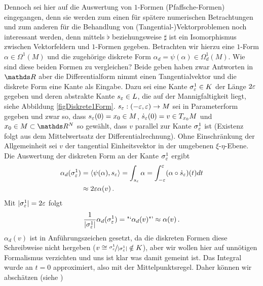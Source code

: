 \begin{bemerkung}
    Dennoch sei hier auf die Auswertung von \( 1 \)-Formen (Pfaffsche-Formen) eingegangen, 
    denn sie werden zum einen für spätere numerischen Betrachtungen und zum anderen für die Behandlung von (Tangential-)Vektorproblemen
    noch interessant werden, denn mittels \( \flat \) beziehungsweise \( \sharp \) ist ein Isomorphismus zwischen Vektorfeldern und \( 1 \)-Formen gegeben.
    Betrachten wir hierzu eine \( 1 \)-Form \( \alpha\in\Omega^{1}(M) \) und die zugehörige diskrete Form \( \alpha_{d} = \psi(\alpha)\in\Omega^{1}_{d}(M) \).
    Wie sind diese beiden Formen zu vergleichen? 
    Beide geben haben zwar Antworten in \( \R \) aber die Differentialform nimmt einen Tangentialvektor und die diskrete Form eine Kante als Eingabe. 
    Dazu sei eine Kante \( \sigma^{1}_{\varepsilon} \in K\) der Länge \( 2\varepsilon \) gegeben und deren abstrakte Kante \( s_{\varepsilon}\in L \), die auf der Mannigfaltigkeit liegt, 
    siehe Abbildung \ref{figDiskrete1Form}.
    \( s_{\varepsilon}: (-\varepsilon,\varepsilon)\rightarrow M \) sei in Parameterform gegeben und zwar so, dass \( s_{\varepsilon}(0)=x_{0}\in M \), \( \dot{s}_{\varepsilon}(0) = v \in T_{x_{0}}M \) 
    und \( x_{0}\in M \subset \R^{N} \) so gewählt, dass \( v \) parallel zur Kante \( \sigma^{1}_{\varepsilon} \) ist (Existenz folgt aus dem Mittelwertsatz der Differentialrechnung).
    Ohne Einschränkung der Allgemeinheit sei \( v \) der tangential Einheitsvektor in der umgebenen \( \xi \)-\( \eta \)-Ebene.
    Die Auswertung der diskreten Form an der Kante \( \sigma^{1}_{\varepsilon} \) ergibt
    \begin{align}
        \alpha_{d}(\sigma_{\varepsilon}^{1}) &= \langle \psi(\alpha) , s_{\varepsilon} \rangle = \int_{s_{\varepsilon}}\alpha = \int_{-\varepsilon}^{\varepsilon} (\alpha \circ \dot{s}_{\varepsilon})(t) dt\\
                                 &\approx 2\varepsilon \alpha(v) \,\text{.}
    \end{align}
    Mit \( |\sigma^{1}_{\varepsilon}| = 2\varepsilon \) folgt 
    \begin{align}
    \label{eqApprox1Form}
      \frac{1}{|\sigma^{1}_{\varepsilon}|} \alpha_{d}(\sigma_{\varepsilon}^{1}) = \text{"`}\alpha_{d}(v)\text{"'} \approx \alpha(v)\,\text{.}
    \end{align}
    \( \alpha_{d}(v) \) ist in Anführungszeichen gesetzt, da die diskreten Formen diese Schreibweise nicht hergeben (\( v \cong \nicefrac{\sigma^{1}_{\varepsilon}}{|\sigma^{1}_{\varepsilon}|} \notin K \)), 
    aber wir wollen hier auf unnötigen Formalismus verzichten und uns ist
    klar was damit gemeint ist.
    Das Integral wurde an \( t=0 \) approximiert, also mit der Mittelpunktsregel.
    Daher können wir abschätzen (siehe \cite[Kap. 7]{einfNum})

\end{bemerkung}
